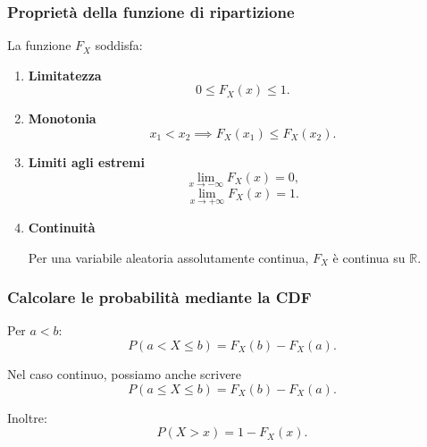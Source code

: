 \subsubsection{Proprietà della funzione di ripartizione}

La funzione $F_X$ soddisfa:

\begin{enumerate}
    \item \textbf{Limitatezza}
    \[
    0\leq F_X(x)\leq1.
    \]

    \item \textbf{Monotonia}
    \[
    x_1<x_2
    \implies
    F_X(x_1)\leq F_X(x_2).
    \]

    \item \textbf{Limiti agli estremi}
    \[
    \lim_{x\to-\infty}F_X(x)=0,
    \]
    \[
    \lim_{x\to+\infty}F_X(x)=1.
    \]

    \item \textbf{Continuità}

    Per una variabile aleatoria
    assolutamente continua,
    $F_X$ è continua su $\mathbb{R}$.
\end{enumerate}

\subsubsection{Calcolare le probabilità mediante la CDF}

Per $a<b$:
\[
\boxed{
P(a<X\leq b)=F_X(b)-F_X(a).
}
\]

Nel caso continuo, possiamo anche scrivere
\[
P(a\leq X\leq b)=F_X(b)-F_X(a).
\]

Inoltre:
\[
P(X>x)=1-F_X(x).
\]

